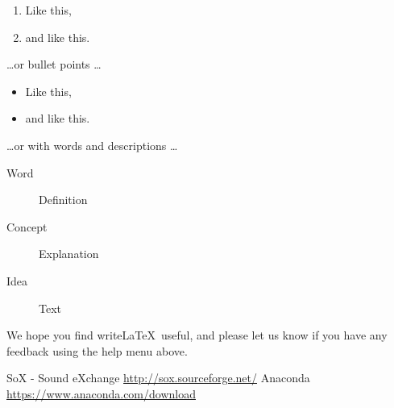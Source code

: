 \documentclass[a4paper]{article}
\begin{document}
\begin{enumerate}
\item Like this,
\item and like this.
\end{enumerate}
\dots or bullet points \dots
\begin{itemize}
\item Like this,
\item and like this.
\end{itemize}
\dots or with words and descriptions \dots
\begin{description}
\item[Word] Definition
\item[Concept] Explanation
\item[Idea] Text
\end{description}

We hope you find write\LaTeX\ useful, and please let us know if you have any feedback using the help menu above.

\begin{thebibliography}{9}
  SoX - Sound eXchange \url{http://sox.sourceforge.net/}
  Anaconda \url{https://www.anaconda.com/download}
\end{thebibliography}
\end{document}
